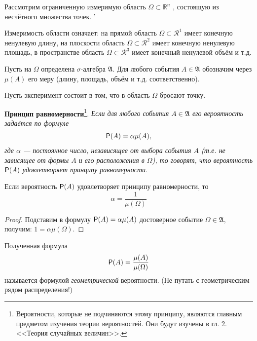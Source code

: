 Рассмотрим ограниченную измеримую область $\Omega \subset \mathbb{R}^n$ , состоящую из несчётного множества точек. '

Измеримость области означает: на прямой область $\Omega \subset \mathcal{R}^1$ имеет конечную ненулевую длину, на плоскости область $\Omega \subset \mathcal{R}^2$ имеет конечную ненулевую площадь, в пространстве область $\Omega \subset \mathcal{R}^3$ имеет конечный ненулевой объём и т.д. 

Пусть на $\Omega$ определена $\sigma$-алгебра $\mathfrak{A}$. Для любого события $A \in \mathfrak{A}$ обозначим через $\mu(A)$ его меру (длину, площадь, объём и т.д. соответственно). 

Пусть эксперимент состоит в том, что в область $\Omega$ бросают точку.

\textbf{Принцип равномерности}\footnote{
Вероятности, которые не подчиняются этому принципу, являются главным предметом изучения теории вероятностей. Они будут изучены в гл. 2. <<Теория случайных величин>>.	
}. 
\textit{Если для любого события $A \in \mathfrak{A}$ его вероятность задаётся по формуле
$$\P(A) = \alpha \mu(A),$$
где $\alpha$ — постоянное число, независящее от выбора события $A$ (т.е. не зависящее от формы $A$ и его расположения в $\Omega$), то говорят, что вероятность $\P(A)$ удовлетворяет принципу равномерности.}

\begin{lemma}
	\label{lemma:4.19}
Если вероятность $\P(A)$ удовлетворяет принципу равномерности, то
$$\alpha=\frac{1}{\mu(\Omega)}$$
\end{lemma}

\begin{proof}
	Подставим в формулу $\P(A) = \alpha \mu(A)$ достоверное событие $\Omega \in \mathfrak{A}$, получим: $1 = \alpha\mu(\Omega).$
\end{proof} 

\begin{definition}
	\label{def:4.20}
Полученная формула
$$\P(A) = \frac{\mu(A)}{\mu(\Omega)}$$
называется формулой \textit{геометрической} вероятности. (Не путать с геометрическим рядом распределения!)
\end{definition}

